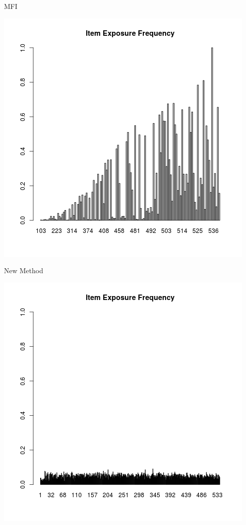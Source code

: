 \documentclass{beamer}
\begin{document}
\begin{frame}{MFI}
  \begin{center}
    \includegraphics[scale = .45]{ItemExposureMFI.png}
  \end{center}
\end{frame}

\begin{frame}{New Method}
  \begin{center}
    \includegraphics[scale = .45]{ItemExposure.png}
  \end{center}
\end{frame}
\end{document}
